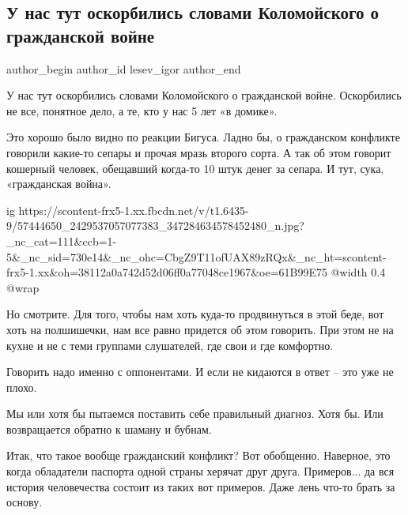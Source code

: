  
 
 
 
 
 
\subsection{У нас тут оскорбились словами Коломойского о гражданской войне}
\label{sec:04_05_2019.fb.lesev_igor.1.kolomojskij_slova_civil_war}
 
\ifcmt
 author_begin
   author_id lesev_igor
 author_end
\fi

У нас тут оскорбились словами Коломойского о гражданской войне. Оскорбились не
все, понятное дело, а те, кто у нас 5 лет «в домике».

Это хорошо было видно по реакции Бигуса. Ладно бы, о гражданском конфликте
говорили какие-то сепары и прочая мразь второго сорта. А так об этом говорит
кошерный человек, обещавший когда-то 10 штук денег за сепара. И тут, сука,
«гражданская война».

\ifcmt
  ig https://scontent-frx5-1.xx.fbcdn.net/v/t1.6435-9/57444650_2429537057077383_347284634578452480_n.jpg?_nc_cat=111&ccb=1-5&_nc_sid=730e14&_nc_ohc=CbgZ9T11ofUAX89zRQx&_nc_ht=scontent-frx5-1.xx&oh=38112a0a742d52d06ff0a77048ce1967&oe=61B99E75
  @width 0.4
  @wrap 
\fi

Но смотрите. Для того, чтобы нам хоть куда-то продвинуться в этой беде, вот
хоть на полшишечки, нам все равно придется об этом говорить. При этом не на
кухне и не с теми группами слушателей, где свои и где комфортно.

Говорить надо именно с оппонентами. И если не кидаются в ответ – это уже не
плохо.

Мы или хотя бы пытаемся поставить себе правильный диагноз. Хотя бы. Или
возвращается обратно к шаману и бубнам.

Итак, что такое вообще гражданский конфликт? Вот обобщенно. Наверное, это когда
обладатели паспорта одной страны херячат друг друга. Примеров... да вся история
человечества состоит из таких вот примеров. Даже лень что-то брать за основу.


